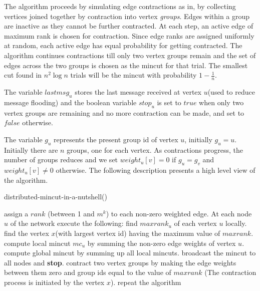 \documentclass{acm_proc_article-sp}
\begin{document}
The algorithm proceeds by simulating edge contractions as in\cite{NRMM97}, by collecting vertices joined together by contraction into vertex {\em groups}. Edges within a group are inactive as they cannot be further contracted. At each step, an active edge of maximum rank is chosen for contraction. Since edge ranks are assigned uniformly at random, each active edge has equal probability for getting contracted. The algorithm continues contractions till only two vertex groups remain and the set of edges across the two groups is chosen as the mincut for that trial. The smallest cut found in $n^{2}\log{n}$ trials will be the mincut with probability $1-\frac{1}{n}$.

The variable $lastmsg_{u}$ stores the last message received at vertex $u$(used to reduce message flooding) and the boolean variable $stop_{u}$ is set to $true$ when only two vertex groups are remaining and no more contraction can be made, and set to $false$ otherwise.

The variable $g_{u}$ represents the present group id of vertex $u$, initially $g_{u}=u$. Initially there are $n$ groups, one for each vertex. As contractions progress, the number of groups reduces and we set $weight_{u}[v]=0$ if $g_{u}=g_{v}$ and $weight_{u}[v]\neq 0$ otherwise.  The following description presents a high level view of the algorithm.


\begin{algorithm}                      \caption{distributed-mincut-in-a-nutshell()}   \label{alg1}                           \begin{algorithmic}
\STATE assign a $rank$ (between 1 and $m^{k}$) to each non-zero weighted edge. 
\STATE At each node $u$ of the network execute the following:
\STATE find $maxrank_{u}$ of each vertex $u$ locally. 
\STATE find the vertex $x$(with largest vertex id) having the maximum value of $maxrank$. 
\STATE compute local mincut $mc_{u}$ by summing the non-zero edge weights of vertex $u$. 
\STATE compute global mincut by summing up all local mincuts. 
\STATE broadcast the mincut to all nodes and \textbf{stop}. 
\ELSE
\STATE contract two vertex groups by making the edge weights between them zero and group ids equal to the value of $maxrank$ (The contraction process is initiated by the vertex $x$). 
\STATE repeat the algorithm
\ENDIF
\end{algorithmic}
\end{algorithm}
\end{document}
